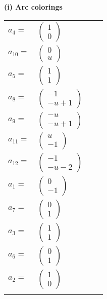 \documentclass[1p]{elsarticle_modified}
\theoremstyle{definition}
\begin{document}
\flushleft \textbf{(i) Arc colorings}\\
\begin{tabular}{m{7pt} m{180pt} m{7pt} m{180pt} }
\flushright $a_{4}=$&$\begin{pmatrix}1\\0\end{pmatrix}$ \\
\flushright $a_{10}=$&$\begin{pmatrix}0\\u\end{pmatrix}$ \\
\flushright $a_{5}=$&$\begin{pmatrix}1\\1\end{pmatrix}$ \\
\flushright $a_{8}=$&$\begin{pmatrix}-1\\- u+1\end{pmatrix}$ \\
\flushright $a_{9}=$&$\begin{pmatrix}- u\\- u+1\end{pmatrix}$ \\
\flushright $a_{11}=$&$\begin{pmatrix}u\\-1\end{pmatrix}$ \\
\flushright $a_{12}=$&$\begin{pmatrix}-1\\- u-2\end{pmatrix}$ \\
\flushright $a_{1}=$&$\begin{pmatrix}0\\-1\end{pmatrix}$ \\
\flushright $a_{7}=$&$\begin{pmatrix}0\\1\end{pmatrix}$ \\
\flushright $a_{3}=$&$\begin{pmatrix}1\\1\end{pmatrix}$ \\
\flushright $a_{6}=$&$\begin{pmatrix}0\\1\end{pmatrix}$ \\
\flushright $a_{2}=$&$\begin{pmatrix}1\\0\end{pmatrix}$\\&\end{tabular}
\end{document}
